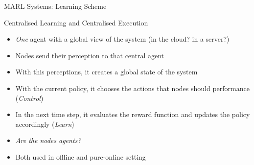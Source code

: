 \documentclass[presentation]{beamer}\mode<presentation>{\usetheme{AMSBolognaFC}}
\begin{document}
\begin{frame}{MARL Systems: Learning Scheme}
	\begin{exampleblock}{Centralised Learning and Centralised Execution}
		\begin{itemize}
			\item \emph{One} agent with a global view of the system (in the cloud? in a server?)
			\item Nodes send their perception to that central agent
			\item With this perceptions, it creates a global state of the system
			\item With the current policy, it chooses the actions that nodes should performance (\emph{Control})
			\item In the next time step, it evaluates the reward function and updates the policy accordingly (\emph{Learn})
			\item \emph{Are the nodes agents?}
			\item Both used in offline and pure-online setting
		\end{itemize}
	\end{exampleblock}

\end{frame}
\end{document}
